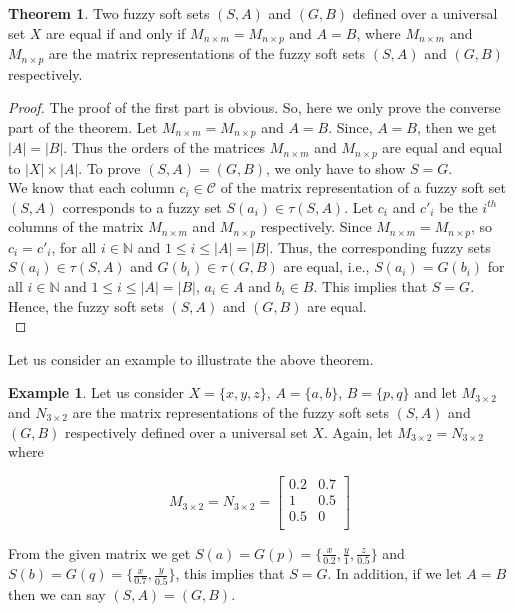 \documentclass{article}
\theoremstyle{definition}
\newtheorem{theorem}{Theorem}[section]
\newtheorem{example}{Example}[section]
\begin{document}
 \begin{theorem}
     Two fuzzy soft sets $(S,A)$ and $(G,B)$ defined over a universal set $X$ are equal if and only if $M_{n\times m} = M_{n\times p}$ and $A=B$, where $M_{n\times m}$ and $M_{n\times p}$ are the matrix representations of the fuzzy soft sets $(S,A)$ and $(G,B)$ respectively. 
 \end{theorem}

 \begin{proof}
     
The proof of the first part is obvious. So, here we only prove the converse part of the theorem. Let $M_{n\times m} = M_{n\times p}$ and $A=B$. Since, $A=B$, then we get $|A|=|B|$. Thus the orders of the matrices $M_{n\times m}$ and $M_{n\times p}$ are equal and equal to $|X|\times |A|$. To prove $(S,A)=(G,B)$, we only have to show $S=G$. \\

We know that each column $c_i\in \mathcal{C}$ of the matrix representation of a fuzzy soft set $(S,A)$ corresponds to a fuzzy set $S(a_i)\in \tau(S,A)$. Let $c_i$ and $c'_i$ be the $i^{th}$ columns of the matrix $M_{n\times m}$ and $M_{n\times p}$ respectively. Since $M_{n\times m} = M_{n\times p}$, so $c_i = c'_i$, for all $i\in \mathbb{N}$ and $1\leq i \leq |A|=|B|$. Thus, the corresponding fuzzy sets $S(a_i)\in \tau(S,A)$ and $G(b_i)\in \tau(G,B)$ are equal, i.e., $S(a_i)=G(b_i)$ for all $i\in \mathbb{N}$ and $1\leq i \leq |A|=|B|$, $a_i \in A$ and $b_i \in B$. This implies that $S=G$. Hence, the fuzzy soft sets $(S,A)$ and $(G,B)$ are equal.\\

 \end{proof}

Let us consider an example to illustrate the above theorem.
 \begin{example}
     Let us consider $X=\{x, y, z\}$, $A=\{a, b\}$, $B=\{p,q\}$ and let $M_{3\times 2}$ and $N_{3\times 2}$ are the matrix representations of the fuzzy soft sets $(S,A)$ and $(G,B)$ respectively defined over a universal set $X$. 
     Again, let $M_{3\times 2} = N_{3\times 2}$ where
\begin{center}
    \[
    M_{3\times 2}=N_{3\times 2}=
    \begin{bmatrix}
         0.2 & 0.7 \\
          1 & 0.5 \\
            0.5 & 0 \\
     \end{bmatrix}
     \]
     \end{center}

     From the given matrix we get $S(a)=G(p)=\{\frac{x}{0.2}, \frac{y}{1}, \frac{z}{0.5}\}$ and $S(b)=G(q)=\{\frac{x}{0.7}, \frac{y}{0.5}\}$, this implies that $S=G$. In addition, if we let $A=B$ then we can say $(S,A)=(G,B)$.
     
 \end{example}
 
\end{document}
